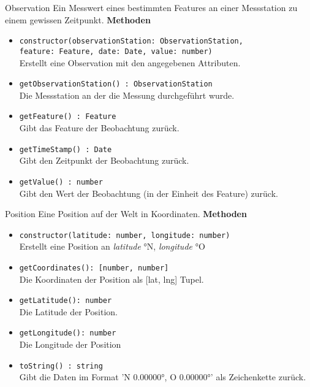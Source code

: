     \begin{Class}{Observation}
        Ein Messwert eines bestimmten Features an einer Messstation zu einem gewissen Zeitpunkt.
        \textbf{Methoden}
        \begin{itemize}
            \item \texttt{constructor(observationStation: ObservationStation, 
            \\feature: Feature, date: Date, value: number)}
            \\ Erstellt eine Observation mit den angegebenen Attributen.
            \item \texttt{getObservationStation() : ObservationStation}
            \\ Die Messstation an der die Messung durchgeführt wurde.
            \item \texttt{getFeature() : Feature}
            \\ Gibt das Feature der Beobachtung zurück.
            \item \texttt{getTimeStamp() : Date}
            \\ Gibt den Zeitpunkt der Beobachtung zurück.
            \item \texttt{getValue() : number}
            \\ Gibt den Wert der Beobachtung (in der Einheit des Feature) zurück.
        \end{itemize}
    \end{Class}

    \begin{Class}{Position}
        Eine Position auf der Welt in Koordinaten.
        \textbf{Methoden}
        \begin{itemize}
            \item \texttt{constructor(latitude: number, longitude: number)}
            \\ Erstellt eine Position an \emph{latitude} °N, \emph{longitude} °O
            \item \texttt{getCoordinates(): [number, number]}
            \\ Die Koordinaten der Position als [lat, lng] Tupel.
            \item \texttt{getLatitude(): number}
            \\ Die Latitude der Position.
            \item \texttt{getLongitude(): number}
            \\ Die Longitude der Position
            \item \texttt{toString() : string}
            \\ Gibt die Daten im Format 'N 0.00000°, O 0.00000°' als Zeichenkette zurück.
        \end{itemize}
    \end{Class}

